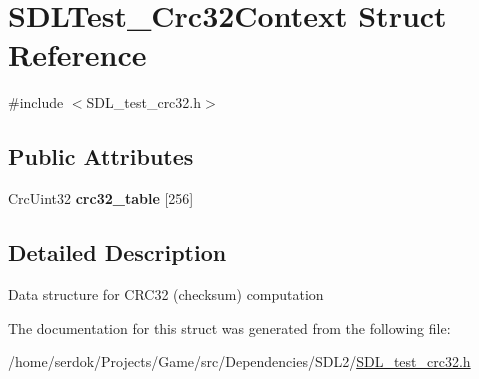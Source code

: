 \hypertarget{structSDLTest__Crc32Context}{}\section{S\+D\+L\+Test\+\_\+\+Crc32\+Context Struct Reference}
\label{structSDLTest__Crc32Context}


{\ttfamily \#include $<$S\+D\+L\+\_\+test\+\_\+crc32.\+h$>$}

\subsection*{Public Attributes}
\begin{DoxyCompactItemize}
\item 
\mbox{\label{structSDLTest__Crc32Context_ae95d0d0b48bafc4e2f6f032f754ffa4c}} 
Crc\+Uint32 {\bfseries crc32\+\_\+table} \mbox{[}256\mbox{]}
\end{DoxyCompactItemize}


\subsection{Detailed Description}
Data structure for C\+R\+C32 (checksum) computation 

The documentation for this struct was generated from the following file\+:\begin{DoxyCompactItemize}
\item 
/home/serdok/\+Projects/\+Game/src/\+Dependencies/\+S\+D\+L2/\hyperlink{SDL__test__crc32_8h}{S\+D\+L\+\_\+test\+\_\+crc32.\+h}\end{DoxyCompactItemize}
